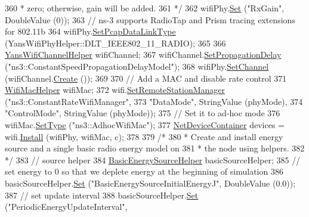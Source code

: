 \begin{DoxyCode}
360 \textcolor{comment}{   * zero; otherwise, gain will be added.}
361 \textcolor{comment}{   */}
362   wifiPhy.\hyperlink{classns3_1_1WifiPhyHelper_a2527d6d7b29f717fd7436166c5f05f1a}{Set} (\textcolor{stringliteral}{"RxGain"}, DoubleValue (0));
363   \textcolor{comment}{// ns-3 supports RadioTap and Prism tracing extensions for 802.11b}
364   wifiPhy.\hyperlink{classns3_1_1WifiPhyHelper_ae4b90e90f6e78a19c1b7fdf08b270218}{SetPcapDataLinkType} (YansWifiPhyHelper::DLT\_IEEE802\_11\_RADIO);
365 
366   \hyperlink{classns3_1_1YansWifiChannelHelper}{YansWifiChannelHelper} wifiChannel;
367   wifiChannel.\hyperlink{classns3_1_1YansWifiChannelHelper_a6b452ba53ccaee6ca000cc72ed9ea0fa}{SetPropagationDelay} (\textcolor{stringliteral}{"ns3::ConstantSpeedPropagationDelayModel"});
368   wifiPhy.\hyperlink{classns3_1_1YansWifiPhyHelper_ad2e9a27587dd4ff320435c93cc2676de}{SetChannel} (wifiChannel.\hyperlink{classns3_1_1YansWifiChannelHelper_a0532e292ab9452f3cf630c848708e563}{Create} ());
369 
370   \textcolor{comment}{// Add a MAC and disable rate control}
371   \hyperlink{classns3_1_1WifiMacHelper}{WifiMacHelper} wifiMac;
372   wifi.\hyperlink{classns3_1_1WifiHelper_a3d01b178aeb2de246ab5a3aa5638ce24}{SetRemoteStationManager} (\textcolor{stringliteral}{"ns3::ConstantRateWifiManager"},
373                                 \textcolor{stringliteral}{"DataMode"}, StringValue (phyMode),
374                                 \textcolor{stringliteral}{"ControlMode"}, StringValue (phyMode));
375   \textcolor{comment}{// Set it to ad-hoc mode}
376   wifiMac.\hyperlink{classns3_1_1WifiMacHelper_a382d8df76a1dd7007179d1963b4b6bc6}{SetType} (\textcolor{stringliteral}{"ns3::AdhocWifiMac"});
377   \hyperlink{classns3_1_1NetDeviceContainer}{NetDeviceContainer} devices = wifi.\hyperlink{classns3_1_1WifiHelper_a451b3d33fa1497c22f06c5451f57a127}{Install} (wifiPhy, wifiMac, c);
378 
379   \textcolor{comment}{/*}
380 \textcolor{comment}{   * Create and install energy source and a single basic radio energy model on}
381 \textcolor{comment}{   * the node using helpers.}
382 \textcolor{comment}{   */}
383   \textcolor{comment}{// source helper}
384   \hyperlink{classns3_1_1BasicEnergySourceHelper}{BasicEnergySourceHelper} basicSourceHelper;
385   \textcolor{comment}{// set energy to 0 so that we deplete energy at the beginning of simulation}
386   basicSourceHelper.\hyperlink{classns3_1_1BasicEnergySourceHelper_aa07c8c1c4a4ced92b8fc51bf4be4de3f}{Set} (\textcolor{stringliteral}{"BasicEnergySourceInitialEnergyJ"}, DoubleValue (0.0));
387   \textcolor{comment}{// set update interval}
388   basicSourceHelper.\hyperlink{classns3_1_1BasicEnergySourceHelper_aa07c8c1c4a4ced92b8fc51bf4be4de3f}{Set} (\textcolor{stringliteral}{"PeriodicEnergyUpdateInterval"},

\end{DoxyCode}
